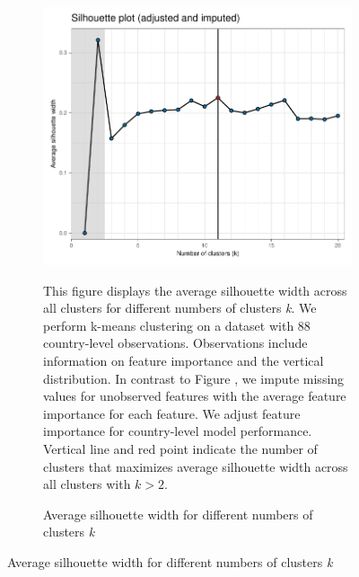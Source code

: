  \begin{figure}[ht!]\ContinuedFloat
   \centering
   \begin{subfigure}[b]{\textwidth}
   \centering
   \caption{Average silhouette width for different numbers of clusters \textit{k}} \label{fig:G1_silhouette_3}
   \includegraphics{Figures_Appendix/Figure_Silhouette_3.pdf}
   \begin{subcaption2}
     This figure displays the average silhouette width across all clusters for different numbers of clusters \textit{k}. We perform k-means clustering on a dataset with 88 country-level observations. Observations include information on feature importance and the vertical distribution. In contrast to Figure , we impute missing values for unobserved features with the average feature importance for each feature. We adjust feature importance for country-level model performance. Vertical line and red point indicate the number of clusters that maximizes average silhouette width across all clusters with $k>2$.
   \end{subcaption2}
   \end{subfigure}
 \end{figure}

 \clearpage

